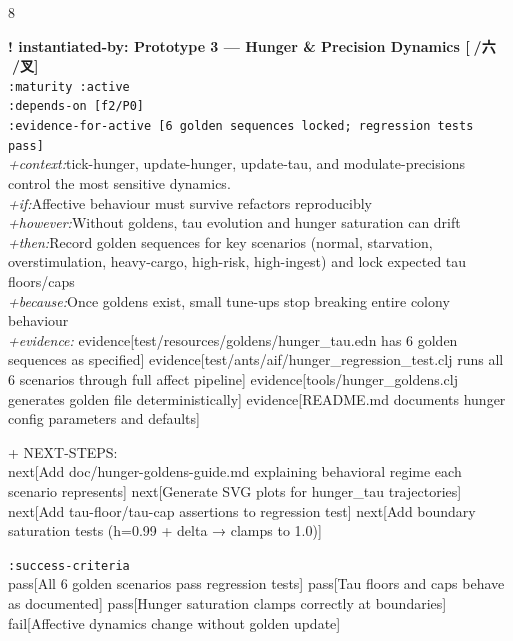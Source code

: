 \documentclass[landscape]{article}
\newcommand{\flexitag}[1]{\textcolor[gray]{0.35}{\textit{#1}}}
\newenvironment{devmapactive}{%
  \def\FrameCommand{\colorbox{devmapactivebg}}%
  \setlength{\fboxsep}{2pt}%
  \MakeFramed{\advance\hsize-\width \FrameRestore}%
}{\endMakeFramed}
\begin{document}
\begin{paracol}{8}
\begin{devmapactive}
\par
\par
\end{devmapactive}
\begin{devmapactive}
\textbf{! instantiated-by: Prototype 3 — Hunger \& Precision Dynamics [💫/六 🙇/叉]}\\
  \texttt{:\allowbreak{}maturity :\allowbreak{}active}\\
  \texttt{:\allowbreak{}depends-\allowbreak{}on [f2/\allowbreak{}P0]}\\
  \texttt{:\allowbreak{}evidence-\allowbreak{}for-\allowbreak{}active [6 golden sequences locked;\allowbreak{} regression tests pass]}\\
  \flexitag{+context:}tick-hunger, update-hunger, update-tau, and modulate-precisions control the most sensitive dynamics.\\
  \flexitag{+if:}Affective behaviour must survive refactors reproducibly\\
  \flexitag{+however:}Without goldens, tau evolution and hunger saturation can drift\\
  \flexitag{+then:}Record golden sequences for key scenarios (normal, starvation, overstimulation, heavy-cargo, high-risk, high-ingest) and lock expected tau floors/caps\\
  \flexitag{+because:}Once goldens exist, small tune-ups stop breaking entire colony behaviour\\
  \flexitag{+evidence:} evidence[test/resources/goldens/hunger\_tau.edn has 6 golden sequences as specified] evidence[test/ants/aif/hunger\_regression\_test.clj runs all 6 scenarios through full affect pipeline] evidence[tools/hunger\_goldens.clj generates golden file deterministically] evidence[README.md documents hunger config parameters and defaults]\\
\par
  + NEXT-STEPS:\\
    next[Add doc/hunger-goldens-guide.md explaining behavioral regime each scenario represents] next[Generate SVG plots for hunger\_tau trajectories] next[Add tau-floor/tau-cap assertions to regression test] next[Add boundary saturation tests (h=0.99 + delta → clamps to 1.0)]\\
\par
  \texttt{:\allowbreak{}success-\allowbreak{}criteria}\\
    pass[All 6 golden scenarios pass regression tests] pass[Tau floors and caps behave as documented] pass[Hunger saturation clamps correctly at boundaries] fail[Affective dynamics change without golden update]\\

\end{devmapactive}
\end{paracol}
\end{document}
